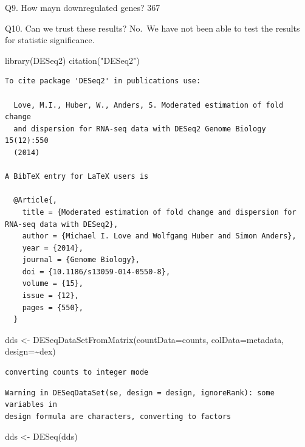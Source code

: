 \documentclass[
  letterpaper,
  DIV=11,
  numbers=noendperiod]{scrartcl}
\newenvironment{Shaded}{\begin{snugshade}}{\end{snugshade}}
\newcommand{\AttributeTok}[1]{\textcolor[rgb]{0.40,0.45,0.13}{#1}}
\newcommand{\FunctionTok}[1]{\textcolor[rgb]{0.28,0.35,0.67}{#1}}
\newcommand{\NormalTok}[1]{\textcolor[rgb]{0.00,0.23,0.31}{#1}}
\newcommand{\OtherTok}[1]{\textcolor[rgb]{0.00,0.23,0.31}{#1}}
\newcommand{\SpecialCharTok}[1]{\textcolor[rgb]{0.37,0.37,0.37}{#1}}
\newcommand{\StringTok}[1]{\textcolor[rgb]{0.13,0.47,0.30}{#1}}
\begin{document}
Q9. How mayn downregulated genes? 367

Q10. Can we trust these results? No.~We have not been able to test the
results for statistic significance.

\begin{Shaded}
\begin{Highlighting}[]
\FunctionTok{library}\NormalTok{(DESeq2)}
\FunctionTok{citation}\NormalTok{(}\StringTok{"DESeq2"}\NormalTok{)}
\end{Highlighting}
\end{Shaded}

\begin{verbatim}
To cite package 'DESeq2' in publications use:

  Love, M.I., Huber, W., Anders, S. Moderated estimation of fold change
  and dispersion for RNA-seq data with DESeq2 Genome Biology 15(12):550
  (2014)

A BibTeX entry for LaTeX users is

  @Article{,
    title = {Moderated estimation of fold change and dispersion for RNA-seq data with DESeq2},
    author = {Michael I. Love and Wolfgang Huber and Simon Anders},
    year = {2014},
    journal = {Genome Biology},
    doi = {10.1186/s13059-014-0550-8},
    volume = {15},
    issue = {12},
    pages = {550},
  }
\end{verbatim}

\begin{Shaded}
\begin{Highlighting}[]
\NormalTok{dds }\OtherTok{\textless{}{-}} \FunctionTok{DESeqDataSetFromMatrix}\NormalTok{(}\AttributeTok{countData=}\NormalTok{counts, }\AttributeTok{colData=}\NormalTok{metadata, }\AttributeTok{design=}\SpecialCharTok{\textasciitilde{}}\NormalTok{dex)}
\end{Highlighting}
\end{Shaded}

\begin{verbatim}
converting counts to integer mode
\end{verbatim}

\begin{verbatim}
Warning in DESeqDataSet(se, design = design, ignoreRank): some variables in
design formula are characters, converting to factors
\end{verbatim}

\begin{Shaded}
\begin{Highlighting}[]
\NormalTok{dds }\OtherTok{\textless{}{-}} \FunctionTok{DESeq}\NormalTok{(dds)}
\end{Highlighting}
\end{Shaded}
\end{document}
